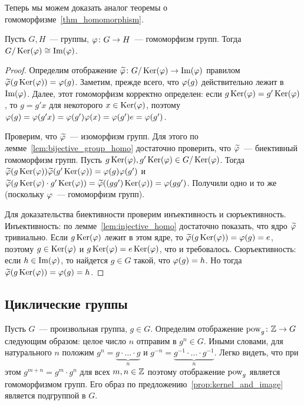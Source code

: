 Теперь мы можем доказать аналог теоремы о
гомоморфизме~\ref{thm_homomorphism}.

\begin{theorem}\label{thm:homomorphism_groups}
Пусть $G, H$~--- группы, $\varphi\colon G\to H$~--- гомоморфизм
групп. Тогда $G/\operatorname{Ker}(\varphi)\cong\operatorname{Im}(\varphi)$.
\end{theorem}

\begin{proof}
Определим отображение $\widetilde{\varphi}\colon G/\operatorname{Ker}(\varphi)\to\operatorname{Im}(\varphi)$
правилом $\widetilde{\varphi}(g\operatorname{Ker}(\varphi)) = \varphi(g)$. Заметим, прежде всего,
что $\varphi(g)$ действительно лежит в $\operatorname{Im}(\varphi)$. Далее, этот
гомоморфизм корректно определен: если $g\operatorname{Ker}(\varphi) = g'\operatorname{Ker}(\varphi)$, то
$g = g'x$ для некоторого $x\in\operatorname{Ker}(\varphi)$, поэтому
$\varphi(g) = \varphi(g'x) = \varphi(g')\varphi(x) = \varphi(g')e = \varphi(g')$.

Проверим, что $\widetilde{\varphi}$~--- изоморфизм групп. Для этого по
лемме~\ref{lem:bijective_group_homo} достаточно проверить, что
$\widetilde{\varphi}$~--- биективный гомоморфизм групп. Пусть
$g\operatorname{Ker}(\varphi), g'\operatorname{Ker}(\varphi)\in G/\operatorname{Ker}(\varphi)$.
Тогда $\widetilde{\varphi}(g\operatorname{Ker}(\varphi))\widetilde{\varphi}(g'\operatorname{Ker}(\varphi)) =
\varphi(g)\varphi(g')$ и $\widetilde{\varphi}(g\operatorname{Ker}(\varphi)\cdot g'\operatorname{Ker}(\varphi)) =
\widetilde{\varphi}((gg')\operatorname{Ker}(\varphi)) = \varphi(gg')$. Получили одно и то же
(поскольку $\varphi$~--- гомоморфизм групп).

Для доказательства биективности проверим инъективность и
сюръективность. Инъективность: по лемме~\ref{lem:injective_homo}
достаточно показать, что ядро $\widetilde{\varphi}$ тривиально. Если
$g\operatorname{Ker}(\varphi)$ лежит в этом ядре, то $\widetilde{\varphi}(g\operatorname{Ker}(\varphi)) = \varphi(g)
= e$, поэтому $g\in\operatorname{Ker}(\varphi)$ и $g\operatorname{Ker}(\varphi) = e\operatorname{Ker}(\varphi)$, что и
требовалось. Сюръективность: если $h\in\operatorname{Im}(\varphi)$, то найдется $g\in
G$ такой, что $\varphi(g) = h$. Но тогда $\widetilde{\varphi}(g\operatorname{Ker}(\varphi)) =
\varphi(g) = h$.
\end{proof}

\subsection{Циклические группы}


Пусть $G$~--- произвольная группа, $g\in G$. Определим отображение
$\operatorname{pow}_g\colon\mathbb Z\to G$ следующим образом: целое число $n$ отправим в
$g^n\in
G$. Иными словами, для натурального $n$ положим
$g^n = \underbrace{g\cdot\dots\cdot g}_n$ и
$g^{-n} = \underbrace{g^{-1}\cdot\dots\cdot g^{-1}}_n$. Легко видеть,
что при этом $g^{m+n} = g^m\cdot g^n$ для всех $m,n\in\mathbb Z$ поэтому
отображение $\operatorname{pow}_g$ является гомоморфизмом групп.
Его образ по предложению~\ref{prop:kernel_and_image} является
подгруппой в $G$.

